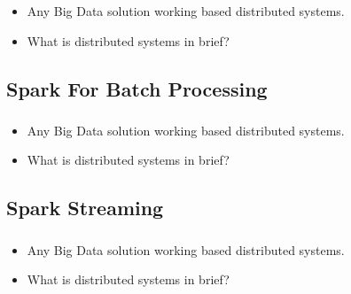 
\begin{frame}
  \frametitle{\subsecname}
	\begin{itemize}[<+->]
		\item Any Big Data solution working based distributed systems.
		\item What is distributed systems in brief?
	\end{itemize}
\end{frame}


\subsection{Spark For Batch Processing}

\begin{frame}
  \frametitle{\subsecname}
	\begin{itemize}[<+->]
		\item Any Big Data solution working based distributed systems.
		\item What is distributed systems in brief?
	\end{itemize}
\end{frame}


\subsection{Spark Streaming}


\begin{frame}
  \frametitle{\subsecname}
	\begin{itemize}[<+->]
		\item Any Big Data solution working based distributed systems.
		\item What is distributed systems in brief?
	\end{itemize}
\end{frame}

